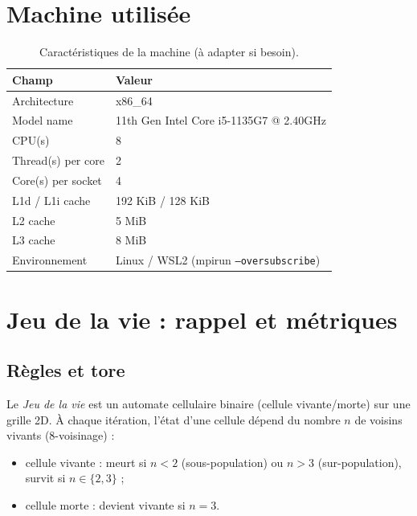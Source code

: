 \documentclass[11pt,a4paper]{article}
\begin{document}
\section{Machine utilisée}

\begin{table}[H]
  \centering
  \small
  \caption{Caract\'eristiques de la machine (à adapter si besoin).}
  \label{tab:pc-specs}
  \begin{tabular}{@{}ll@{}}
    \toprule
    Champ & Valeur \\
    \midrule
    Architecture & x86\_64 \\
    Model name & 11th Gen Intel Core i5-1135G7 @ 2.40GHz \\
    CPU(s) & 8 \\
    Thread(s) per core & 2 \\
    Core(s) per socket & 4 \\
    L1d / L1i cache & 192 KiB / 128 KiB \\
    L2 cache & 5 MiB \\
    L3 cache & 8 MiB \\
    Environnement & Linux / WSL2 (mpirun \texttt{--oversubscribe}) \\
    \bottomrule
  \end{tabular}
\end{table}

\section{Jeu de la vie : rappel et métriques}

\subsection{Règles et tore}

Le \emph{Jeu de la vie} est un automate cellulaire binaire (cellule vivante/morte) sur une grille 2D. À chaque itération, l’état d’une cellule dépend du nombre $n$ de voisins vivants (8-voisinage) :
\begin{itemize}[leftmargin=1.2em]
  \item cellule vivante : meurt si $n < 2$ (sous-population) ou $n > 3$ (sur-population), survit si $n \in \{2,3\}$ ;
  \item cellule morte : devient vivante si $n = 3$.
\end{itemize}
\end{document}
